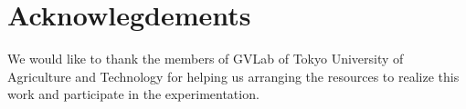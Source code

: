 \documentclass{llncs}
\begin{document}
\section{Acknowlegdements}
%
		We would like to thank the members of GVLab of Tokyo University of Agriculture and Technology for helping us arranging the resources to realize this work and participate in the experimentation.
%
%
%


%
%
%
%

\end{document}
